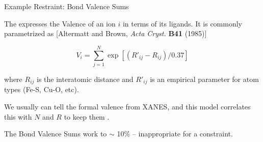 \begin{slide}{Example Restraint: Bond Valence Sums}
    
    The {} expresses the Valence of an ion $i$ in terms
    of its ligands. It is commonly parametrized as [Altermatt and Brown,
    {\emph{Acta Cryst.} {\bf{B41}}} (1985)]
    
    \[  V_i =  \sum_{j=1}^N \exp[(R'_{ij} - R_{ij})/ 0.37]   \]
    
    where $R_{ij}$ is the interatomic distance and $R'_{ij}$ is an
    empirical parameter for atom types (Fe-S, Cu-O, etc).

    \vmm
    
    We usually can tell the formal valence from XANES, and this model
    correlates this with $N$ and $R$ to keep them {}.
    
    \vmm \vmm
    \vmm \vmm
    
    The Bond Valence Sums work to $\sim$ 10\% -- inappropriate for a
    constraint.

\vfill
\end{slide} 


